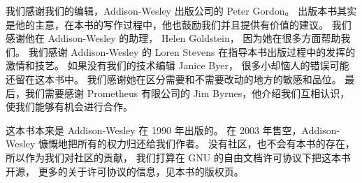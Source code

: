 我们感谢我们的编辑，Addison-Wesley 出版公司的 Peter Gordon。
出版本书其实是他的主意，在本书的写作过程中，他也鼓励我们并且提供有价值的建议。
我们感谢他在 Addison-Wesley 的助理， Helen Goldstein， 因为她在很多方面帮助我们。
我们感谢 Addison-Wesley 的 Loren Stevens 在指导本书出版过程中的发挥的激情和技艺。
如果没有我们的技术编辑 Janice Byer， 很多小却恼人的错误可能还留在这本书中。
我们感谢她在区分需要和不需要改动的地方的敏感和品位。
最后，我们需要感谢 Prometheus 有限公司的 Jim Byrnes，他介绍我们互相认识，使我们能够有机会进行合作。
\baselineskip

%


\baselineskip

 这本书本来是 Addison-Wesley 在 1990 年出版的。
在 2003 年售空，Addison-Wesley 慷慨地把所有的权力归还给我们作者。
没有社区，也不会有本书的存在，所以作为我们对社区的贡献，
我们打算在 GNU 的自由文档许可协议下把这本书开源，
更多的关于许可协议的信息，见本书的版权页。

